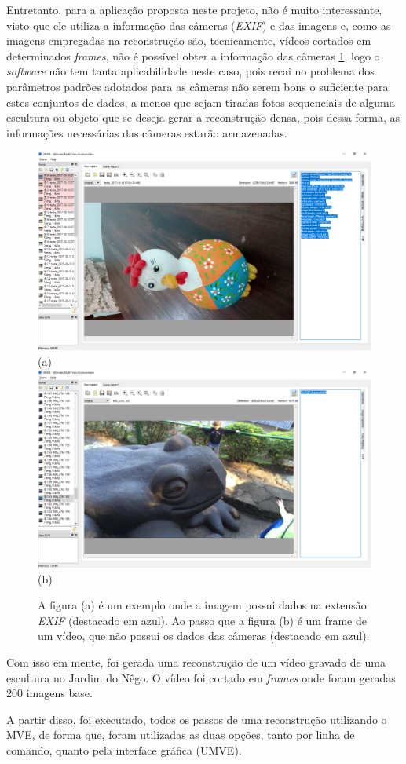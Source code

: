 Entretanto, para a aplicação proposta neste projeto, não é muito interessante, visto que ele utiliza a informação das câmeras (\emph{EXIF}) e das imagens e, como as imagens empregadas na reconstrução são, tecnicamente, vídeos cortados em determinados \emph{frames}, não é possível obter a informação das câmeras \ref{fig:mveexif}, logo o \emph{software} não tem tanta aplicabilidade neste caso, pois recai no problema dos parâmetros padrões adotados para as câmeras não serem bons o suficiente para estes conjuntos de dados, a menos que sejam tiradas fotos sequenciais de alguma escultura ou objeto que se deseja gerar a reconstrução densa, pois dessa forma, as informações necessárias das câmeras estarão armazenadas.

\begin{figure}[!h]
	\centering
	\includegraphics[width=0.5\linewidth]{figs/exifumve.png}(a)
	\includegraphics[width=0.5\linewidth]{figs/exifsemumve.png}(b)
	\caption{%
	A figura (a) é um exemplo onde a imagem possui dados na extensão \emph{EXIF} (destacado em azul). Ao passo que a figura (b) é um frame de um vídeo, que não possui os dados das câmeras (destacado em azul).
	}\label{fig:mveexif}
\end{figure} 

Com isso em mente, foi gerada uma reconstrução de um vídeo gravado de uma escultura no Jardim do Nêgo. O  vídeo foi cortado em \emph{frames} onde foram geradas 200 imagens base. 

A partir disso, foi executado, todos os passos de uma reconstrução utilizando o MVE, de forma que, foram utilizadas as duas opções, tanto por linha de comando, quanto pela interface gráfica (UMVE).

